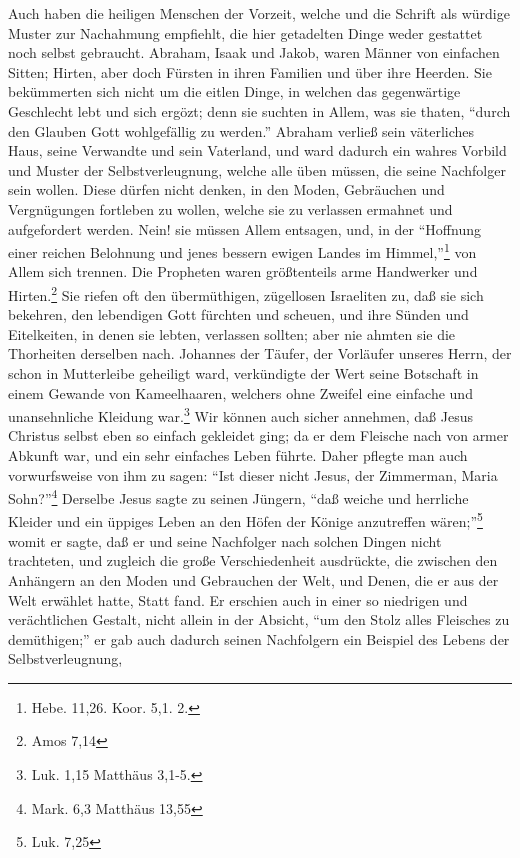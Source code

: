 Auch haben die heiligen Menschen der Vorzeit, welche und die Schrift als würdige
Muster zur Nachahmung empfiehlt, die hier getadelten Dinge weder gestattet noch
selbst gebraucht. Abraham, Isaak und Jakob, waren Männer von einfachen Sitten;
Hirten, aber doch Fürsten in ihren Familien und über ihre Heerden. Sie
bekümmerten sich nicht um die eitlen Dinge, in welchen das gegenwärtige
Geschlecht lebt und sich ergözt; denn sie suchten in Allem, was sie thaten,
"`durch den Glauben Gott wohlgefällig zu werden."' Abraham verließ sein
väterliches Haus, seine Verwandte und sein Vaterland, und ward dadurch ein
wahres Vorbild und Muster der Selbstverleugnung, welche alle üben müssen, die
seine Nachfolger sein wollen. Diese dürfen nicht denken, in den Moden,
Gebräuchen und Vergnügungen fortleben zu wollen, welche sie zu verlassen
ermahnet und aufgefordert werden. Nein! sie müssen Allem entsagen, und, in der
"`Hoffnung einer reichen Belohnung und jenes bessern ewigen Landes im
Himmel,"'\footnote{Hebe. 11,26. Koor. 5,1. 2.} von Allem sich trennen. Die
Propheten waren größtenteils arme Handwerker und Hirten.\footnote{Amos 7,14} Sie
riefen oft den übermüthigen, zügellosen Israeliten zu, daß sie sich bekehren,
den lebendigen Gott fürchten und scheuen, und ihre Sünden und Eitelkeiten, in
denen sie lebten, verlassen sollten; aber nie ahmten sie die Thorheiten
derselben nach. Johannes der Täufer, der Vorläufer unseres Herrn, der schon in
Mutterleibe geheiligt ward, verkündigte der Wert seine Botschaft in einem
Gewande von Kameelhaaren, welchers ohne Zweifel eine einfache und unansehnliche
Kleidung war.\footnote{Luk. 1,15 Matthäus 3,1-5.} Wir können auch sicher annehmen,
daß Jesus Christus selbst eben so einfach gekleidet ging; da er dem Fleische
nach von armer Abkunft war, und ein sehr einfaches Leben führte. Daher pflegte
man auch vorwurfsweise von ihm zu sagen: "`Ist dieser nicht Jesus, der
Zimmerman, Maria Sohn?"'\footnote{Mark. 6,3 Matthäus 13,55} Derselbe Jesus sagte
zu seinen Jüngern, "`daß weiche und herrliche Kleider und ein üppiges Leben an
den Höfen der Könige anzutreffen wären;"'\footnote{Luk. 7,25} womit er sagte,
daß er und seine Nachfolger nach solchen Dingen nicht trachteten, und zugleich
die große Verschiedenheit ausdrückte, die zwischen den Anhängern an den Moden
und Gebrauchen der Welt, und Denen, die er aus der Welt erwählet hatte, Statt
fand. Er erschien auch in einer so niedrigen und verächtlichen Gestalt, nicht
allein in der Absicht, "`um den Stolz alles Fleisches zu demüthigen;"' er gab
auch dadurch seinen Nachfolgern ein Beispiel des Lebens der Selbstverleugnung,
